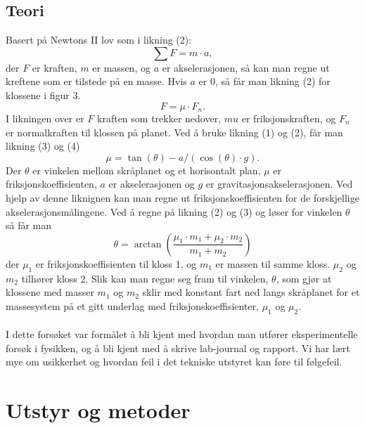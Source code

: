 \documentclass[10pt,a4paper]{report}
\begin{document}
\section*{Teori}
Basert på Newtons II lov som i likning (2): 
\begin{equation}
\sum{F} = m \cdot a,
\end{equation} der $F$ er kraften, $m$ er massen, og $a$ er akselerasjonen, så kan man regne ut kreftene som er tilstede på en masse. Hvis $a$ er 0, så får man likning (2) for klossene i figur 3. 
\begin{equation}
F = \mu \cdot F_n.
\end{equation}
I likningen over er $F$ kraften som trekker nedover, $mu$ er friksjonskraften, og $F_n$ er normalkraften til klossen på planet.
Ved å bruke likning (1) og (2), får man likning (3) og (4)
\begin{equation}
\mu = \tan(\theta)-a/(\cos(\theta)\cdot g).
\end{equation}
Der $\theta$ er vinkelen mellom skråplanet og et horisontalt plan, $\mu$ er friksjonskoeffisienten, $a$ er akselerasjonen og $g$ er gravitasjonsakselerasjonen. Ved hjelp av denne liknignen kan man regne ut friksjonskoeffisienten for de forskjellige akselerasjonsmålingene. Ved å regne på likning (2) og (3) og løser for vinkelen $\theta$ så får man
\begin{equation}
\theta = \arctan(\frac{\mu_1 \cdot m_1+\mu_2 \cdot m_2}{m_1+m_2})
\end{equation}
der $\mu_1$ er friksjonskoeffisienten til kloss 1, og $m_1$ er massen til samme kloss. $\mu_2$ og $m_2$ tilhører kloss 2. Slik kan man regne seg fram til vinkelen, $\theta$, som gjør at klossene med masser $m_1$ og $m_2$ sklir med konstant fart ned langs skråplanet for et massesystem på et gitt underlag med friksjonskoeffisienter, $\mu_1$ og $\mu_2$.\\
\\I dette forsøket var formålet å bli kjent med hvordan man utfører eksperimentelle forsøk i fysikken, og å bli kjent med å skrive lab-journal og rapport. Vi har lært mye om usikkerhet og hvordan feil i det tekniske utstyret kan føre til følgefeil.

\chapter*{Utstyr og metoder}
\end{document}
